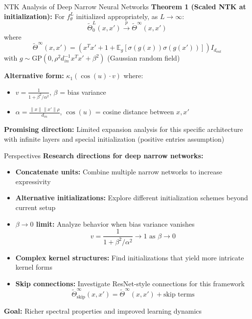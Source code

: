 \documentclass{beamer}
\newcommand{\E}{\mathbb{E}}
\begin{document}
\begin{frame}{NTK Analysis of Deep Narrow Neural Networks}
\textbf{Theorem 1 (Scaled NTK at initialization):}
For $f^L_\theta$ initialized appropriately, as $L \to \infty$:
\[ \tilde{\Theta}^L_0(x, x') \xrightarrow{p} \tilde{\Theta}^\infty(x, x') \]
where
\[ \tilde{\Theta}^\infty(x, x') = (x^T x' + 1 + \E_g[\sigma(g(x))\sigma(g(x'))]) I_{d_{out}} \]
with $g \sim \text{GP}(0, \rho^2 d_{in}^{-1} x^T x' + \beta^2)$ (Gaussian random field)

\textbf{Alternative form:} $\kappa_1(\cos(u) \cdot v)$ where:
\begin{itemize}
\item $v = \frac{1}{1 + \beta^2/\alpha^2}$, $\beta$ = bias variance
\item $\alpha = \frac{\|x\| \|x'\| \rho}{d_{in}}$, $\cos(u)$ = cosine distance between $x, x'$
\end{itemize}

\textbf{Promising direction:} Limited expansion analysis for this specific architecture with infinite layers and special initialization (positive entries assumption)
\end{frame}

\begin{frame}{Perspectives}
\textbf{Research directions for deep narrow networks:}
\begin{itemize}
\item \textbf{Concatenate units:} Combine multiple narrow networks to increase expressivity
\item \textbf{Alternative initializations:} Explore different initialization schemes beyond current setup
\item \textbf{$\beta \to 0$ limit:} Analyze behavior when bias variance vanishes
\[ v = \frac{1}{1 + \beta^2/\alpha^2} \to 1 \text{ as } \beta \to 0 \]
\item \textbf{Complex kernel structures:} Find initializations that yield more intricate kernel forms
\item \textbf{Skip connections:} Investigate ResNet-style connections for this framework
\[ \tilde{\Theta}^\infty_{\text{skip}}(x, x') = \tilde{\Theta}^\infty(x, x') + \text{skip terms} \]
\end{itemize}

\textbf{Goal:} Richer spectral properties and improved learning dynamics
\end{frame}
\end{document}
